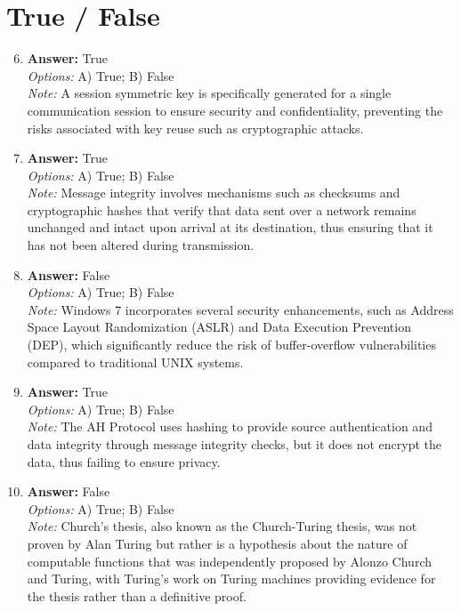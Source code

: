 \documentclass[12pt]{article}
\begin{document}
\section*{True / False}
\begin{enumerate}[label=\arabic*.]
\setcounter{enumi}{5}
\item \textbf{Answer:} True
\\ \textit{Options:} A) True; B) False
\\ \textit{Note:} A session symmetric key is specifically generated for a single communication session to ensure security and confidentiality, preventing the risks associated with key reuse such as cryptographic attacks.
\item \textbf{Answer:} True
\\ \textit{Options:} A) True; B) False
\\ \textit{Note:} Message integrity involves mechanisms such as checksums and cryptographic hashes that verify that data sent over a network remains unchanged and intact upon arrival at its destination, thus ensuring that it has not been altered during transmission.
\item \textbf{Answer:} False
\\ \textit{Options:} A) True; B) False
\\ \textit{Note:} Windows 7 incorporates several security enhancements, such as Address Space Layout Randomization (ASLR) and Data Execution Prevention (DEP), which significantly reduce the risk of buffer-overflow vulnerabilities compared to traditional UNIX systems.
\item \textbf{Answer:} True
\\ \textit{Options:} A) True; B) False
\\ \textit{Note:} The AH Protocol uses hashing to provide source authentication and data integrity through message integrity checks, but it does not encrypt the data, thus failing to ensure privacy.
\item \textbf{Answer:} False
\\ \textit{Options:} A) True; B) False
\\ \textit{Note:} Church's thesis, also known as the Church-Turing thesis, was not proven by Alan Turing but rather is a hypothesis about the nature of computable functions that was independently proposed by Alonzo Church and Turing, with Turing's work on Turing machines providing evidence for the thesis rather than a definitive proof.
\end{enumerate}
\end{document}
